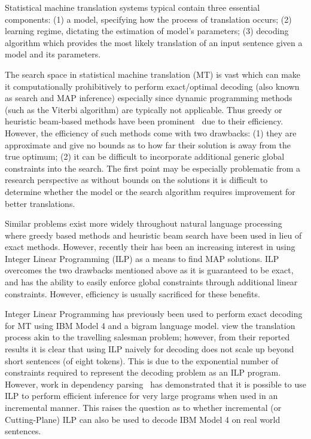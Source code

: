 Statistical machine translation systems typical contain three
essential components: (1) a model, specifying how the process of
translation occurs; (2) learning regime, dictating the estimation of
model's parameters; (3) decoding algorithm which provides the most
likely translation of an input sentence given a model and its
parameters.

The search space in statistical machine translation (MT) is vast which
can make it computationally prohibitively to perform exact/optimal
decoding (also known as search and MAP inference) especially since
dynamic programming methods (such as the Viterbi algorithm) are
typically not applicable.  Thus greedy or heuristic beam-based methods
have been prominent~\citep{moses} due to their efficiency.  However,
the efficiency of such methods come with two drawbacks: (1) they are
approximate and give no bounds as to how far their solution is away
from the true optimum; (2) it can be difficult to incorporate
additional generic global constraints into the search.  The first
point may be especially problematic from a research perspective as
without bounds on the solutions it is difficult to determine whether
the model or the search algorithm requires improvement for better
translations.

Similar problems exist more widely throughout natural language
processing where greedy based methods and heuristic beam search have
been used in lieu of exact methods.  However, recently their has been
an increasing interest in using Integer Linear Programming (ILP) as a
means to find MAP solutions.  ILP overcomes the two drawbacks
mentioned above as it is guaranteed to be exact, and has the ability
to easily enforce global constraints through additional linear
constraints.  However, efficiency is usually sacrificed for these
benefits.

Integer Linear Programming has previously been used to perform exact
decoding for MT using IBM Model 4 and a bigram language model.
\cite{GermannFast04} view the translation process akin to the
travelling salesman problem; however, from their reported results it
is clear that using ILP naively for decoding does not scale up beyond
short sentences (of eight tokens).  This is due to the exponential
number of constraints required to represent the decoding problem as an
ILP program.  However, work in dependency
parsing~\citep{riedel06incremental} has demonstrated that it is
possible to use ILP to perform efficient inference for very large
programs when used in an incremental manner.  This raises the question
as to whether incremental (or Cutting-Plane) ILP can also be used to
decode IBM Model 4 on real world sentences.

